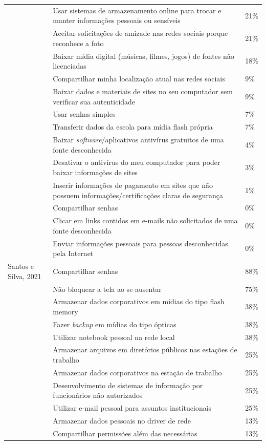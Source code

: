 \documentclass[portuguese]{textolivre}
\begin{document}
\begin{footnotesize}
\begin{longtable}{p{2cm} p{5cm} p{3cm}}
& Usar sistemas de armazenamento online para trocar e manter informações pessoais ou sensíveis & 21\% \\
& Aceitar solicitações de amizade nas redes sociais porque reconhece a foto & 21\% \\
& Baixar mídia digital (músicas, filmes, jogos) de fontes não licenciadas & 18\% \\
& Compartilhar minha localização atual nas redes sociais & 9\% \\
& Baixar dados e materiais de sites no seu computador sem verificar sua	autenticidade & 9\% \\
& Usar senhas simples & 7\% \\
& Transferir dados da escola para mídia flash própria & 7\% \\
& Baixar \emph{software}/aplicativos antivírus gratuitos de uma fonte desconhecida & 4\% \\
& Desativar o antivírus do meu computador para poder baixar informações	de sites & 3\% \\
& Inserir informações de pagamento em sites que não possuem informações/certificações claras de segurança & 1\% \\
& Compartilhar senhas & 0\% \\
& Clicar em links contidos em e-mails não solicitados de uma fonte desconhecida & 0\% \\
& Enviar informações pessoais para pessoas desconhecidas pela Internet & 0\% \\
\midrule
Santos e Silva, 2021 & Compartilhar senhas & 88\% \\
& Não bloquear a tela ao se ausentar & 75\% \\
& Armazenar dados corporativos em mídias do tipo flash memory & 38\% \\
& Fazer \emph{backup} em mídias do tipo ópticas & 38\% \\
& Utilizar notebook pessoal na rede local & 38\% \\
& Armazenar arquivos em diretórios públicos nas estações de trabalho & 25\% \\
& Armazenar dados corporativos na estação de trabalho & 25\% \\
& Desenvolvimento de sistemas de informação por funcionários não autorizados & 25\% \\
& Utilizar e-mail pessoal para assuntos institucionais & 25\% \\
& Armazenar dados pessoais no driver de rede & 13\% \\
& Compartilhar permissões além das necessárias & 13\% \\

\end{longtable}
\end{footnotesize}
\end{document}
